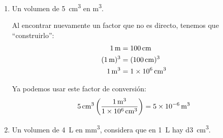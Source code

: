 \documentclass[14pt]{extarticle}
\begin{document}
\begin{enumerate}
\begin{enumerate}
Tomemos en cuenta que no hay un factor de conversión \enquote{directo} para pasar de \unit{\square\kilo\meter} a \unit{\square\centi\meter}, por lo que hay que construirlo:
\begin{align*}
    \SI{1}{\meter} &= \SI{100}{\centi\meter} \\
    \SI{1}{\kilo\meter} &= \SI{100000}{\centi\meter} \\
    (\SI{1}{\kilo\meter})^{2} &= (\SI{100000}{\centi\meter})^{2} = \\
    \SI{1}{\square\kilo\meter} &= \SI{1d10}{\square\centi\meter}    
\end{align*}
Una vez obtenido el factor de conversión, lo ocupamos:
\begin{align*}
    \SI{2}{\square\kilo\meter} \left( \dfrac{\SI{1d10}{\square\centi\meter}}{\SI{1}{\square\kilo\meter}} \right) = \SI{2d10}{\square\centi\meter}
\end{align*}
\item Un volumen de \SI{5}{\cubic\centi\meter} en \unit{\cubic\meter}.

Al encontrar nuevamente un factor que no es directo, tenemos que \enquote{construirlo}:
\begin{align*}
\SI{1}{\meter} &= \SI{100}{\centi\meter} \\
(\SI{1}{\meter})^{3} &= (\SI{100}{\centi\meter})^{3} \\
\SI{1}{\cubic\meter} &= \SI{1d6}{\cubic\centi\meter}
\end{align*}

Ya podemos usar este factor de conversión:
\begin{align*}
\SI{5}{\cubic\centi\meter} \left( \dfrac{\SI{1}{\cubic\meter}}{\SI{1d6}{\cubic\centi\meter}} \right) = \SI{5d-6}{\cubic\meter}
\end{align*}
\item Un volumen de \SI{4}{\liter} en \unit{\cubic\milli\meter}, considera que en \SI{1}{\liter} hay \SI{d3}{\cubic\centi\meter}.


\end{enumerate}
\end{enumerate}
\end{document}
